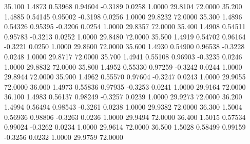   35.100   1.4873   0.53968   0.94604  -0.3189   0.0258   1.0000  29.8104  72.0000
  35.200   1.4885   0.54145   0.95002  -0.3198   0.0256   1.0000  29.8232  72.0000
  35.300   1.4896   0.54326   0.95395  -0.3206   0.0254   1.0000  29.8357  72.0000
  35.400   1.4908   0.54511   0.95783  -0.3213   0.0252   1.0000  29.8480  72.0000
  35.500   1.4919   0.54702   0.96164  -0.3221   0.0250   1.0000  29.8600  72.0000
  35.600   1.4930   0.54900   0.96538  -0.3228   0.0248   1.0000  29.8717  72.0000
  35.700   1.4941   0.55108   0.96903  -0.3235   0.0246   1.0000  29.8832  72.0000
  35.800   1.4952   0.55330   0.97259  -0.3242   0.0244   1.0000  29.8944  72.0000
  35.900   1.4962   0.55570   0.97604  -0.3247   0.0243   1.0000  29.9055  72.0000
  36.000   1.4973   0.55836   0.97935  -0.3253   0.0241   1.0000  29.9164  72.0000
  36.100   1.4983   0.56137   0.98249  -0.3257   0.0239   1.0000  29.9273  72.0000
  36.200   1.4994   0.56494   0.98543  -0.3261   0.0238   1.0000  29.9382  72.0000
  36.300   1.5004   0.56936   0.98806  -0.3263   0.0236   1.0000  29.9494  72.0000
  36.400   1.5015   0.57534   0.99024  -0.3262   0.0234   1.0000  29.9614  72.0000
  36.500   1.5028   0.58499   0.99159  -0.3256   0.0232   1.0000  29.9759  72.0000
